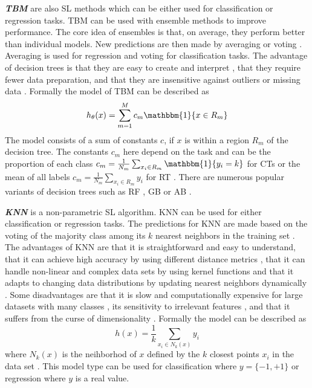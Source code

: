 \textbf{\emph{\acf{TBM}}} are also \ac{SL} methods which can be either used for classification or regression tasks. \ac{TBM} can be used with ensemble methods to improve performance. The core idea of ensembles is that, on average, they perform better than individual models. New predictions are then made by averaging \cite{hastie2009elements} or voting \cite{cootes2012robust}. Averaging is used for regression and voting for classification tasks. The advantage of decision trees is that they are easy to create \cite{almuallim2002development} and interpret \cite{kingsford2008decision}, that they require fewer data preparation, and that they are insensitive against outliers or missing data \cite{decisionTreesAdvantages}. Formally the model of \ac{TBM} can be described as
\begin{equation}
    h_\theta(x)=\sum_{m=1}^M c_m \mathbbm{1}\{x \in R_m\}
\end{equation}
The model consists of a sum of constants $c$, if $x$ is within a region $R_m$ of the decision tree. The constants $c_m$ here depend on the task and can be the proportion of each class $c_m=\frac{1}{N_m}\sum_{x_i \in R_m}\mathbbm{1}\{y_i=k\}$ for \acp{CT} or the mean of all labels $c_m=\frac{1}{N_m}\sum_{x_i \in R_m} y_i$ for \ac{RT} \cite{hastie2009elements}. There are numerous popular variants of decision trees such as \ac{RF} \cite{cutler2012random}, \ac{GB} \cite{ke2017lightgbm} or \ac{AB} \cite{wu2020application}.

\textbf{\emph{\acf{KNN}}} is a non-parametric \ac{SL} algorithm. \ac{KNN} can be used for either classification or regression tasks. The predictions for \ac{KNN} are made based on the voting of the majority class among its $k$ nearest neighbors in the training set \cite{doi:10.1142/S0218195905001622}. The advantages of \ac{KNN} are that it is straightforward and easy to understand, that it can achieve high accuracy by using different distance metrics \cite{Uddin2022}, that it can handle non-linear and complex data sets by using kernel functions and that it adapts to changing data distributions by updating nearest neighbors dynamically \cite{zhangzhonghengKNN}. Some disadvantages are that it is slow and computationally expensive for large datasets with many classes \cite{Uddin2022}, its sensitivity to irrelevant features \cite{zhangzhonghengKNN}, and that it suffers from the curse of dimensionality \cite{kouiroukidis2011effects}. Formally the model can be described as
\begin{equation}
    h(x)=\frac{1}{k}\sum_{x_i \in N_k(x)} y_i
\end{equation}
where $N_k(x)$ is the neihborhod of $x$ defined by the $k$ closest points $x_i$ in the data set \cite{hastie2009elements}. This model type can be used for classification where $y=\{-1,+1\}$ or regression where $y$ is a real value.

